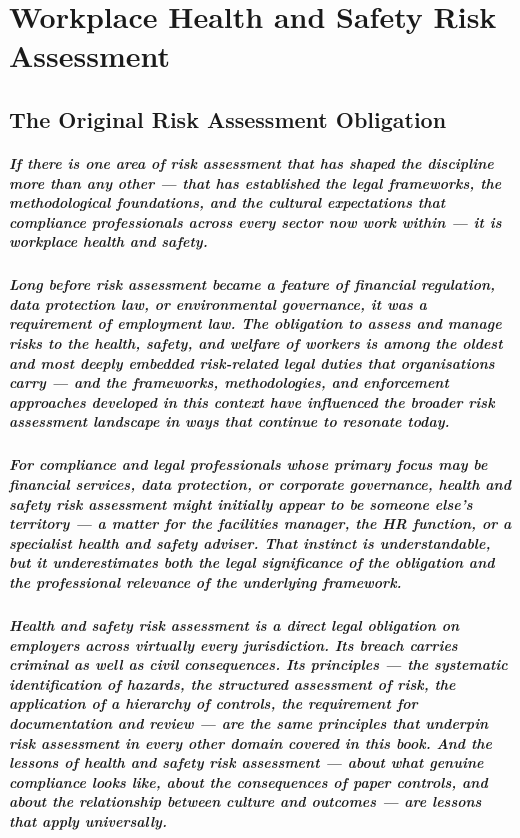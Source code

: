 \chapter{Workplace Health and Safety Risk Assessment}
\label{chap:Workplace Health and Safety Risk Assessment}

\section{The Original Risk Assessment Obligation}
\paragraph{If there is one area of risk assessment that has shaped the discipline more than any other — that has established the legal frameworks, the methodological foundations, and the cultural expectations that compliance professionals across every sector now work within — it is workplace health and safety.}
\paragraph{Long before risk assessment became a feature of financial regulation, data protection law, or environmental governance, it was a requirement of employment law. The obligation to assess and manage risks to the health, safety, and welfare of workers is among the oldest and most deeply embedded risk-related legal duties that organisations carry — and the frameworks, methodologies, and enforcement approaches developed in this context have influenced the broader risk assessment landscape in ways that continue to resonate today.}
\paragraph{For compliance and legal professionals whose primary focus may be financial services, data protection, or corporate governance, health and safety risk assessment might initially appear to be someone else's territory — a matter for the facilities manager, the HR function, or a specialist health and safety adviser. That instinct is understandable, but it underestimates both the legal significance of the obligation and the professional relevance of the underlying framework.}
\paragraph{Health and safety risk assessment is a direct legal obligation on employers across virtually every jurisdiction. Its breach carries criminal as well as civil consequences. Its principles — the systematic identification of hazards, the structured assessment of risk, the application of a hierarchy of controls, the requirement for documentation and review — are the same principles that underpin risk assessment in every other domain covered in this book. And the lessons of health and safety risk assessment — about what genuine compliance looks like, about the consequences of paper controls, and about the relationship between culture and outcomes — are lessons that apply universally.}
